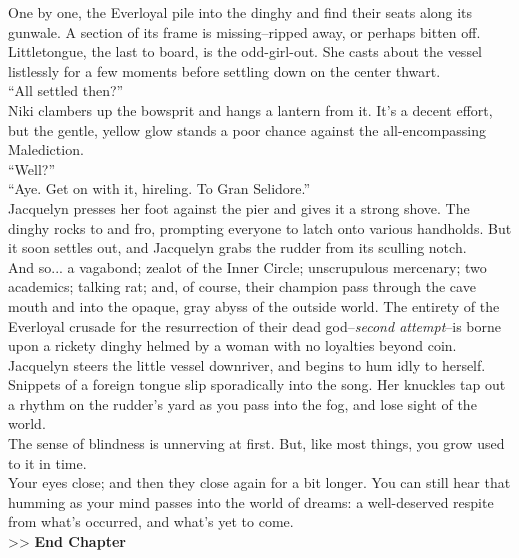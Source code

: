 One by one, the Everloyal pile into the dinghy and find their seats along its gunwale. A section of its frame is missing--ripped away, or perhaps bitten off. Littletongue, the last to board, is the odd-girl-out. She casts about the vessel listlessly for a few moments before settling down on the center thwart.\\

“All settled then?”\\

Niki clambers up the bowsprit and hangs a lantern from it. It’s a decent effort, but the gentle, yellow glow stands a poor chance against the all-encompassing Malediction.\\

“Well?”\\

“Aye. Get on with it, hireling. To Gran Selidore.”\\

Jacquelyn presses her foot against the pier and gives it a strong shove. The dinghy rocks to and fro, prompting everyone to latch onto various handholds. But it soon settles out, and Jacquelyn grabs the rudder from its sculling notch.\\

And so... a vagabond; zealot of the Inner Circle; unscrupulous mercenary; two academics; talking rat; and, of course, their champion pass through the cave mouth and into the opaque, gray abyss of the outside world. The entirety of the Everloyal crusade for the resurrection of their dead god--\emph{second attempt}--is borne upon a rickety dinghy helmed by a woman with no loyalties beyond coin.\\

Jacquelyn steers the little vessel downriver, and begins to hum idly to herself. Snippets of a foreign tongue slip sporadically into the song. Her knuckles tap out a rhythm on the rudder’s yard as you pass into the fog, and lose sight of the world.\\

The sense of blindness is unnerving at first. But, like most things, you grow used to it in time.\\

Your eyes close; and then they close again for a bit longer. You can still hear that humming as your mind passes into the world of dreams: a well-deserved respite from what’s occurred, and what’s yet to come.\\

>> \textbf{End Chapter}